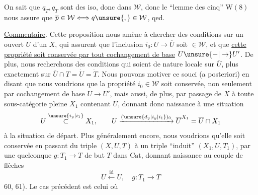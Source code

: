 
On sait que $q_{\dot T},q_T$ sont des iso, donc dans $\mathcal W$,
donc le ``lemme des cinq'' $\mathrm W(8)$ nous assure que
$\overline p\in\mathcal W\Longleftrightarrow q\unsure{,}\in\mathcal W$, qed.

\uline{Commentaire}. Cette proposition nous amène à
chercher des conditions sur un ouvert $U$ d'un
$X$, qui assurent que l'inclusion $i_0:U\to\overline U$
soit $\in\mathcal W$, et que \uline{cette propriété soit conservée
par tout cochangement de base} $U\unsure{-|\to}U'$. De
plus, nous recherchons des conditions qui soient
de nature locale sur $\overline U$, plus exactement sur
$\overline U\cap T=\dot U=\dot T$. Nous pouvons motiver ce
souci (a posteriori) en disant que nous
voudrions que la propriété $i_0\in\mathcal W$ soit conservée, non seulement par cochangement de base
 $U\to U'$, mais aussi, de plus, par
passage de $X$ à toute sous-catégorie pleine
$X_1$ contenant $U$, donnant donc naissance
à une situation
\[
 U\overset{\unsure{i_y|i_1}}{\subset} X_1,\qquad
 U\xrightarrow{(\unsure{d_y|i_y|i_1})_0}\overline U^{X_1}=\overline U\cap X_1
\]
 à la situation de départ. Plus
généralement encore, nous voudrions qu'elle
soit conservée en passant du 
triple $(X,U,T)$ à un triple ``induit'' $(X_1,U,T_1)$,
par  une  quelconque $g:T_1\to T$ de
but $T$ dans $\mathrm{Cat}$, donnant naissance au
couple de flèches
\[
 U\xleftarrow{\mathrm{id}}U,\quad g:T_1\to T
\]
 60, 61). Le cas précédent est celui où


